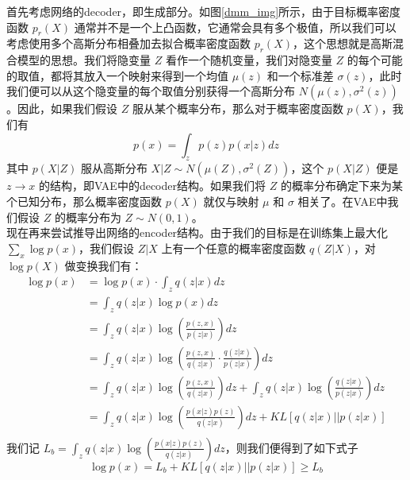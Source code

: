 \documentclass[12pt,a4paper,UTF8]{article}
\begin{document}
\indent 首先考虑网络的decoder，即生成部分。如图\ref{dmm_img}所示，由于目标概率密度函数 $p_r\left(X\right)$ 通常并不是一个上凸函数，它通常会具有多个极值，所以我们可以考虑使用多个高斯分布相叠加去拟合概率密度函数 $p_r\left(X\right)$，这个思想就是高斯混合模型的思想。我们将隐变量 $Z$ 看作一个随机变量，我们对隐变量 $Z$ 的每个可能的取值，都将其放入一个映射来得到一个均值 $\mu\left(z\right)$ 和一个标准差 $\sigma\left(z\right)$，此时我们便可以从这个隐变量的每个取值分别获得一个高斯分布 $N\left(\mu\left(z\right),\sigma^2\left(z\right)\right)$。因此，如果我们假设 $Z$ 服从某个概率分布，那么对于概率密度函数 $p\left(X\right)$，我们有
\[p\left(x\right)=\int_zp\left(z\right)p\left(x|z\right)dz\]
其中 $p\left(X|Z\right)$ 服从高斯分布 $X|Z\sim N\left(\mu\left(Z\right),\sigma^2\left(Z\right)\right)$，这个 $p\left(X|Z\right)$ 便是 $z\to x$ 的结构，即VAE中的decoder结构。如果我们将 $Z$ 的概率分布确定下来为某个已知分布，那么概率密度函数 $p\left(X\right)$ 就仅与映射 $\mu$ 和 $\sigma$ 相关了。在VAE中我们假设 $Z$ 的概率分布为 $Z\sim N\left(0,1\right)$。\\
\indent 现在再来尝试推导出网络的encoder结构。由于我们的目标是在训练集上最大化 $\sum\limits_x\log p\left(x\right)$，我们假设 $Z|X$ 上有一个任意的概率密度函数 $q\left(Z|X\right)$，对 $\log p\left(X\right)$ 做变换我们有：
\[\begin{aligned}
\log p\left(x\right)&=\log p\left(x\right)\cdot\int_zq\left(z|x\right)dz\\
&=\int_zq\left(z|x\right)\log p\left(x\right)dz\\
&=\int_zq\left(z|x\right)\log\left(\frac{p\left(z,x\right)}{p\left(z|x\right)}\right)dz\\
&=\int_zq\left(z|x\right)\log\left(\frac{p\left(z,x\right)}{q\left(z|x\right)}\cdot\frac{q\left(z|x\right)}{p\left(z|x\right)}\right)dz\\
&=\int_zq\left(z|x\right)\log\left(\frac{p\left(z,x\right)}{q\left(z|x\right)}\right)dz+\int_zq\left(z|x\right)\log\left(\frac{q\left(z|x\right)}{p\left(z|x\right)}\right)dz\\
&=\int_zq\left(z|x\right)\log\left(\frac{p\left(x|z\right)p\left(z\right)}{q\left(z|x\right)}\right)dz+KL\left[q\left(z|x\right)||p\left(z|x\right)\right]\\
\end{aligned}\]
我们记 $L_b=\int_zq\left(z|x\right)\log\left(\frac{p\left(x|z\right)p\left(z\right)}{q\left(z|x\right)}\right)dz$，则我们便得到了如下式子
\[\log p\left(x\right)=L_b+KL\left[q\left(z|x\right)||p\left(z|x\right)\right]\geq L_b\]
\end{document}
